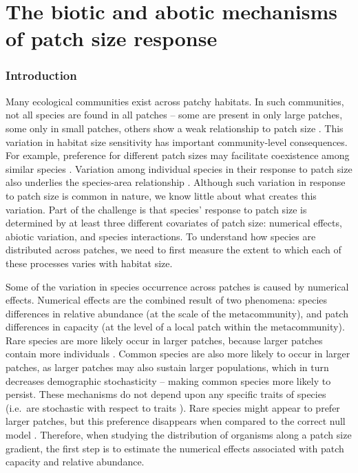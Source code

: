 \chapter{The biotic and abotic mechanisms of patch size response}
\label{chap:astar}

\subsection{Introduction}\label{introduction}

Many ecological communities exist across patchy habitats. In such
communities, not all species are found in all patches -- some are
present in only large patches, some only in small patches, others show a
weak relationship to patch size \citep{Taylor1991, Lomolino2000}. This
variation in habitat size sensitivity has important community-level
consequences. For example, preference for different patch sizes may
facilitate coexistence among similar species \citep{Gilbert2008}.
Variation among individual species in their response to patch size also
underlies the species-area relationship \citep{Ovaskainen2003}. Although
such variation in response to patch size is common in nature, we know
little about what creates this variation. Part of the challenge is that
species' response to patch size is determined by at least three
different covariates of patch size: numerical effects, abiotic
variation, and species interactions. To understand how species are
distributed across patches, we need to first measure the extent to which
each of these processes varies with habitat size.

Some of the variation in species occurrence across patches is caused by
numerical effects. Numerical effects are the combined result of two
phenomena: species differences in relative abundance (at the scale of
the metacommunity), and patch differences in capacity (at the level of a
local patch within the metacommunity). Rare species are more likely
occur in larger patches, because larger patches contain more individuals
\citep{Wright1991}. Common species are also more likely to occur in
larger patches, as larger patches may also sustain larger populations,
which in turn decreases demographic stochasticity -- making common
species more likely to persist. These mechanisms do not depend upon any
specific traits of species (i.e.~are stochastic with respect to traits
\citep{Vellend2014}). Rare species might appear to prefer larger
patches, but this preference disappears when compared to the correct
null model \citep{Srivastava2008}. Therefore, when studying the
distribution of organisms along a patch size gradient, the first step is
to estimate the numerical effects associated with patch capacity and
relative abundance.

